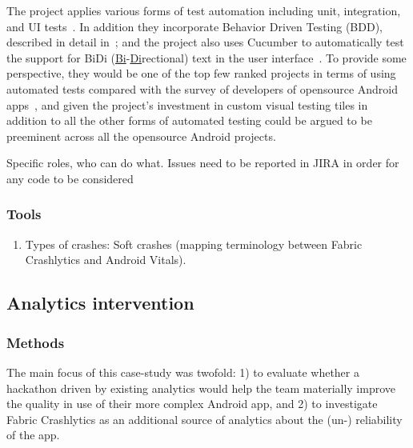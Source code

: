 The project applies various forms of test automation including unit, integration, and UI tests~\citep{luhana2018streamlining}. In addition they incorporate Behavior Driven Testing (BDD), described in detail in~\citep{ali2019using_catrobat}; and the project also uses Cucumber to automatically test the support for BiDi (\underline{Bi}-\underline{Di}rectional) text in the user interface~\citep{ayyal2016automated_bidi_testing, awwad2017_automated_bidi_testing, ali2019behavior_catrobat}. To provide some perspective, they would be one of the top few ranked projects in terms of using automated tests compared with the survey of developers of opensource Android apps~\citep{linares2017_how_do_developers_test_android_apps}, and given the project's investment in custom visual testing tiles in addition to all the other forms of automated testing could be argued to be preeminent across all the opensource Android projects. 

Specific roles, who can do what.
Issues need to be reported in JIRA in order for any code to be considered



\subsubsection{Tools}

\begin{enumerate}
    \item Types of crashes: Soft crashes (mapping terminology between Fabric Crashlytics and Android Vitals).
\end{enumerate}

\subsection{Analytics intervention}


\subsubsection{Methods}
The main focus of this case-study was twofold: 1) to evaluate whether a hackathon driven by existing analytics would help the team materially improve the quality in use of their more complex Android app, and 2) to investigate Fabric Crashlytics as an additional source of analytics about the (un-) reliability of the app.

